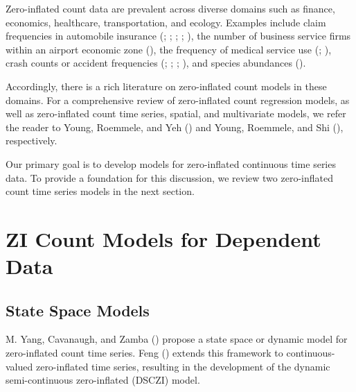 \documentclass[
  letterpaper,
  double,
  12pt,
  1.0in]{beavtex}
\begin{document}
Zero-inflated count data are prevalent across diverse domains such as
finance, economics, healthcare, transportation, and ecology. Examples
include claim frequencies in automobile insurance
(;
;
;
;
), the number of
business service firms within an airport economic zone
(), the frequency
of medical service use (; ),
crash counts or accident frequencies
(;
;
;
), and
species abundances ().

Accordingly, there is a rich literature on zero-inflated count models in
these domains. For a comprehensive review of zero-inflated count
regression models, as well as zero-inflated count time series, spatial,
and multivariate models, we refer the reader to Young, Roemmele, and Yeh
() and Young, Roemmele, and Shi
(), respectively.

Our primary goal is to develop models for zero-inflated continuous time
series data. To provide a foundation for this discussion, we review two
zero-inflated count time series models in the next section.

\section{ZI Count Models for Dependent
Data}\label{sec-ch2-background-zi-count-dependent}

\subsection{State Space Models}\label{state-space-models}

M. Yang, Cavanaugh, and Zamba ()
propose a state space or dynamic model for zero-inflated count time
series. Feng () extends this framework
to continuous-valued zero-inflated time series, resulting in the
development of the dynamic semi-continuous zero-inflated (DSCZI) model.
\end{document}
